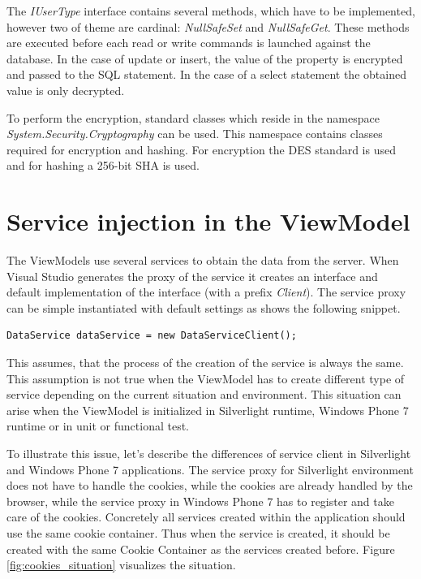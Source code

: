The \textit{IUserType} interface contains several methods, which have to be implemented, however two of theme are cardinal: \textit{NullSafeSet} and \textit{NullSafeGet}. These methods are executed before each read or write commands is launched against the database. In the case of update or insert, the value of the property is encrypted and passed to the SQL statement. In the case of a select statement the obtained value is only decrypted.

To perform the encryption, standard classes which reside in the namespace \textit{System.Security.Cryptography} can be used. This namespace contains classes required for encryption and hashing. For encryption the DES standard is used and for hashing a 256-bit SHA is used.

\section{Service injection in the ViewModel}
The ViewModels use several services to obtain the data from the server. When Visual Studio generates the proxy of the service it creates an interface and default implementation of the interface (with a prefix \textit{Client}). The service proxy can be simple instantiated with default settings as shows the following snippet.

\begin{verbatim}
DataService dataService = new DataServiceClient();
\end{verbatim}

This assumes, that the process of the creation of the service is always the same. This assumption is not true when the ViewModel has to create different type of service depending on the current situation and environment. This situation can arise when the ViewModel is initialized in Silverlight runtime, Windows Phone 7 runtime or in unit or functional test.

To illustrate this issue, let's describe the differences of service client in Silverlight and Windows Phone 7 applications. The service proxy for Silverlight environment does not have to handle the cookies, while the cookies are already handled by the browser, while the service proxy in Windows Phone 7 has to register and take care of the cookies. Concretely all services created within the application should use the same cookie container. Thus when the service is created, it should be created with the same Cookie Container as the services created before. Figure \ref{fig:cookies_situation} visualizes the situation.

